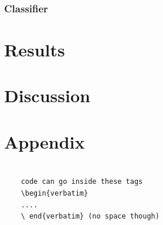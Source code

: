 \documentclass[12pt]{article}
\begin{document}
\subsubsection{Classifier}

\section{Results}

\section{Discussion}

\section*{Appendix}

\begin{verbatim}
	
	code can go inside these tags 
	\begin{verbatim} 
	.... 
	\ end{verbatim} (no space though)
	
\end{verbatim}
\end{document}
